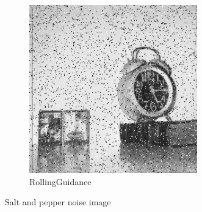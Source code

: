 \documentclass[12pt]{article}
\begin{document}
\begin{figure}
		\begin{subfigure}{0.4\textwidth}
			\centering
			\includegraphics[width=0.8\textwidth]{saltandpepper/SaltAndPepperpngRollingGuidanceFilter.png}
			\caption{RollingGuidance}
		\end{subfigure}
		\caption{Salt and pepper noise image}
	\end{figure}
\end{document}
